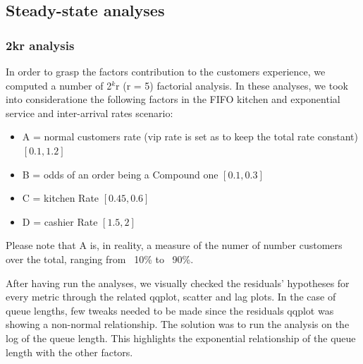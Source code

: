\subsection{Steady-state analyses}

\subsubsection{2kr analysis}\label{sec:2kr}
In order to grasp the factors contribution to the customers experience, we computed a number of 2$^k$r (r = 5) factorial analysis. In these analyses, we took into 
consideratione the following factors in the FIFO kitchen and exponential service and inter-arrival rates scenario: 
\begin{itemize}
  \item A = normal customers rate (vip rate is set as to keep the total rate constant) $[0.1, 1.2]$
  \item B = odds of an order being a Compound one $[0.1, 0.3]$
  \item C = kitchen Rate $[0.45, 0.6]$
  \item D = cashier Rate $[1.5, 2]$
\end{itemize}
Please note that A is, in reality, a measure of the numer of number customers 
over the total, ranging from ~10\% to ~90\%.

After having run the analyses, we visually checked the residuals' hypotheses for every metric through the related qqplot, scatter and lag plots. In the case of queue lengths, few tweaks needed to be made since the residuals qqplot was showing a non-normal relationship. The solution was to run the analysis on the log of the queue length. This highlights the exponential relationship of the queue length with the other factors.

